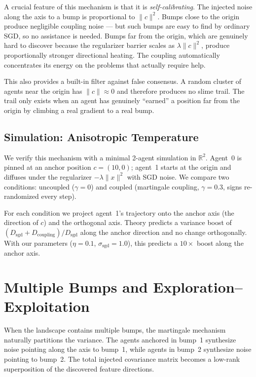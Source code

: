 \documentclass{article}
\begin{document}
A crucial feature of this mechanism is that it is \emph{self-calibrating}. The injected noise along the axis to a bump is proportional to $\|c\|^2$. Bumps close to the origin produce negligible coupling noise --- but such bumps are easy to find by ordinary SGD, so no assistance is needed. Bumps far from the origin, which are genuinely hard to discover because the regularizer barrier scales as $\lambda \|c\|^2$, produce proportionally stronger directional heating. The coupling automatically concentrates its energy on the problems that actually require help.

This also provides a built-in filter against false consensus. A random cluster of agents near the origin has $\|c\| \approx 0$ and therefore produces no slime trail. The trail only exists when an agent has genuinely ``earned'' a position far from the origin by climbing a real gradient to a real bump.

\subsection{Simulation: Anisotropic Temperature}

We verify this mechanism with a minimal 2-agent simulation in $\mathbb{R}^2$.
Agent~0 is pinned at an anchor position $c = (10, 0)$; agent~1 starts at the
origin and diffuses under the regularizer $-\lambda\|x\|^2$ with SGD noise.
We compare two conditions: uncoupled ($\gamma = 0$) and coupled (martingale
coupling, $\gamma = 0.3$, signs re-randomized every step).

For each condition we project agent~1's trajectory onto the anchor axis
(the direction of $c$) and the orthogonal axis. Theory predicts a variance
boost of $(D_{\text{sgd}} + D_{\text{coupling}}) / D_{\text{sgd}}$ along
the anchor direction and no change orthogonally. With our parameters
($\eta = 0.1$, $\sigma_{\text{sgd}} = 1.0$), this predicts a $10\times$
boost along the anchor axis.







\section{Multiple Bumps and Exploration--Exploitation}

When the landscape contains multiple bumps, the martingale mechanism
naturally partitions the variance. The agents anchored in bump~1 synthesize noise pointing along the axis to bump~1, while agents in bump~2 synthesize noise pointing to bump~2. The total injected covariance matrix becomes a low-rank superposition of the discovered feature directions.
\end{document}
